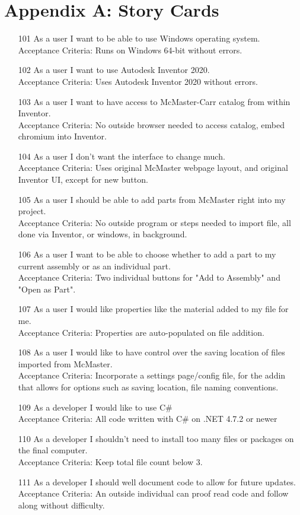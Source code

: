 \documentclass[12pt, letterpaper]{article}
\begin{document}
\section{Appendix A: Story Cards}
\begin{itemize}
    \item [101] As a user I want to be able to use Windows operating system.\\
    Acceptance Criteria: Runs on Windows 64-bit without errors.
    \item [102] As a user I want to use Autodesk Inventor 2020.\\
    Acceptance Criteria: Uses Autodesk Inventor 2020 without errors.
    \item [103] As a user I want to have access to McMaster-Carr catalog from within Inventor.\\
    Acceptance Criteria: No outside browser needed to access catalog, embed chromium into Inventor.
    \item [104] As a user I don't want the interface to change much.\\
    Acceptance Criteria: Uses original McMaster webpage layout, and original Inventor UI, except for new button.
    \item [105] As a user I should be able to add parts from McMaster right into my project.\\
    Acceptance Criteria: No outside program or steps needed to import file, all done via Inventor, or windows, in background.
    \item [106] As a user I want to be able to choose whether to add a part to my current
    assembly or as an individual part.\\
    Acceptance Criteria: Two individual buttons for "Add to Assembly" and "Open as Part".
    \item [107] As a user I would like properties like the material added to my file for me.\\
    Acceptance Criteria: Properties are auto-populated on file addition.
    \item [108] As a user I would like to have control over the saving location of files imported from McMaster.\\
    Acceptance Criteria: Incorporate a settings page/config file, for the addin that allows for options such as saving location, file naming conventions.
    \item [109] As a developer I would like to use C\# \\
    Acceptance Criteria: All code written with C\# on .NET 4.7.2 or newer
    \item [110] As a developer I shouldn't need to install too many files or packages on the final computer.\\
    Acceptance Criteria: Keep total file count below 3.
    \item [111] As a developer I should well document code to allow for future updates.\\
    Acceptance Criteria: An outside individual can proof read code and follow along without difficulty.
\end{itemize}
\end{document}
